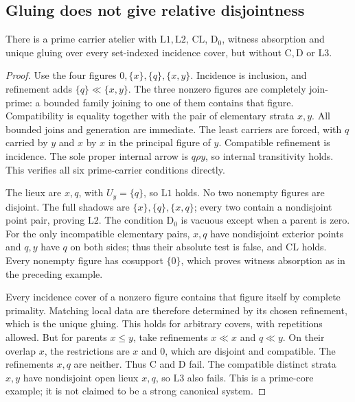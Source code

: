 \subsection{Gluing does not give relative disjointness}
\begin{counterexample}
\label{ex:gluing-relative}
There is a prime carrier atelier with $\mathrm L1,\mathrm L2$,
$\mathrm{CL}$, $\mathrm D_0$, witness absorption and unique gluing
over every set-indexed incidence cover, but without
$\mathrm C,\mathrm D$ or $\mathrm L3$.
\end{counterexample}
\begin{proof}
Use the four figures $0,\{x\},\{q\},\{x,y\}$.
Incidence is inclusion, and refinement adds
$\{q\}\ll\{x,y\}$. The three nonzero figures are completely
join-prime: a bounded family joining to one of them contains
that figure. Compatibility is equality together with the pair
of elementary strata $x,y$. All bounded joins and generation
are immediate. The least carriers are forced, with $q$ carried
by $y$ and $x$ by $x$ in the principal figure of $y$.
Compatible refinement is incidence. The sole proper internal
arrow is $q\rho y$, so internal transitivity holds. This verifies
all six prime-carrier conditions directly.

The lieux are $x,q$, with $U_y=\{q\}$, so $\mathrm L1$ holds.
No two nonempty figures are disjoint. The full shadows are
$\{x\},\{q\},\{x,q\}$; every two contain a nondisjoint point
pair, proving $\mathrm L2$. The condition $\mathrm D_0$ is
vacuous except when a parent is zero. For the only incompatible
elementary pairs, $x,q$ have nondisjoint exterior points and
$q,y$ have $q$ on both sides; thus their absolute test is false,
and $\mathrm{CL}$ holds. Every nonempty figure has cosupport
$\{0\}$, which proves witness absorption as in the preceding
example.

Every incidence cover of a nonzero figure contains that figure
itself by complete primality. Matching local data are therefore
determined by its chosen refinement, which is the unique gluing.
This holds for arbitrary covers, with repetitions allowed.
But for parents $x\leq y$, take refinements $x\ll x$ and
$q\ll y$. On their overlap $x$, the restrictions are $x$ and
$0$, which are disjoint and compatible. The refinements $x,q$
are neither. Thus $\mathrm C$ and $\mathrm D$ fail.
The compatible distinct strata $x,y$ have nondisjoint open lieux
$x,q$, so $\mathrm L3$ also fails. This is a prime-core example;
it is not claimed to be a strong canonical system.
\end{proof}

